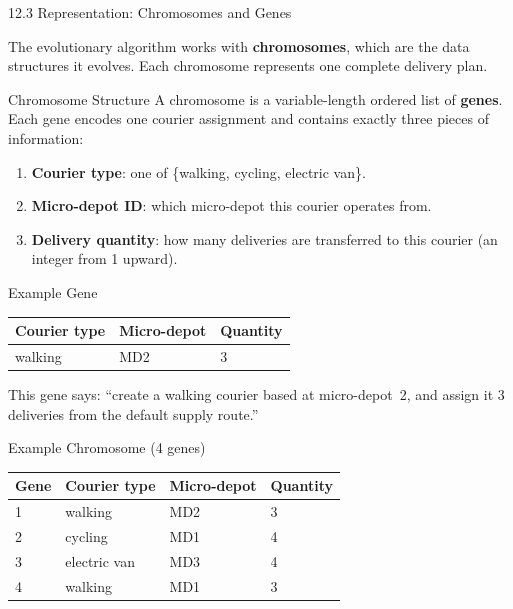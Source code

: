 \documentclass[aspectratio=169,10pt]{beamer}
\begin{document}
\begin{frame}[allowframebreaks]{12.3 Representation: Chromosomes and Genes}

The evolutionary algorithm works with \textbf{chromosomes},
which are the data structures it evolves.
Each chromosome represents one complete delivery plan.

\medskip

\begin{block}{Chromosome Structure}
  A chromosome is a variable-length ordered list of \textbf{genes}.
  Each gene encodes one courier assignment and contains exactly
  three pieces of information:
  \begin{enumerate}
    \item \textbf{Courier type}: one of \{walking, cycling, electric van\}.
    \item \textbf{Micro-depot ID}: which micro-depot this courier
          operates from.
    \item \textbf{Delivery quantity}: how many deliveries are
          transferred to this courier (an integer from 1 upward).
  \end{enumerate}
\end{block}

\medskip

\begin{exampleblock}{Example Gene}
  \begin{tabular}{lll}
    \toprule
    Courier type & Micro-depot & Quantity \\
    \midrule
    walking & MD2 & 3 \\
    \bottomrule
  \end{tabular}

  \smallskip
  This gene says: ``create a walking courier based at micro-depot~2,
  and assign it 3 deliveries from the default supply route.''
\end{exampleblock}

\medskip

\begin{exampleblock}{Example Chromosome (4 genes)}
  \begin{tabular}{llll}
    \toprule
    Gene & Courier type & Micro-depot & Quantity \\
    \midrule
    1 & walking       & MD2 & 3 \\
    2 & cycling       & MD1 & 4 \\
    3 & electric van  & MD3 & 4 \\
    4 & walking       & MD1 & 3 \\
    \bottomrule
  \end{tabular}


\end{exampleblock}
\end{frame}
\end{document}
